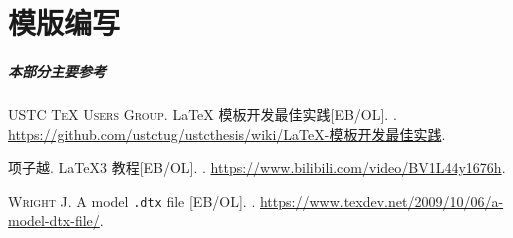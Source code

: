 
\part{模版编写}

\begin{frame}
  \frametitle{本部分主要参考}

  \begin{bibliolist}{00}
    \onlineitem \textsc{USTC \TeX{} Users Group}.
    \newblock \LaTeX{} 模板开发最佳实践[EB/OL].
    . \href{https://github.com/ustctug/ustcthesis/wiki/LaTeX-模板开发最佳实践}
    {\ttfamily https://github.com/ustctug/ustcthesis/wiki/LaTeX-模板开发最佳实践}.

    \onlineitem 项子越.
    \newblock \LaTeX3 教程[EB/OL].
    . \url{https://www.bilibili.com/video/BV1L44y1676h}.

    \onlineitem \textsc{Wright J.}
    \newblock A model \texttt{.dtx} file [EB/OL].
    . \url{https://www.texdev.net/2009/10/06/a-model-dtx-file/}.
  \end{bibliolist}

\end{frame}

